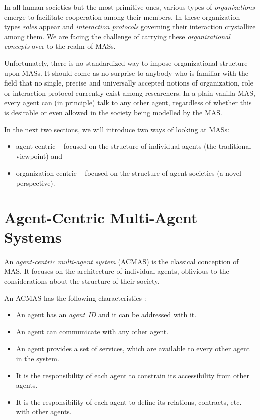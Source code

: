 In all human societies but the most primitive ones, various types of \textit{organizations} emerge to facilitate cooperation among their members.
In these organization types \textit{roles} appear and \textit{interaction protocols} governing their interaction crystallize among them.
We are facing the challenge of carrying these \textit{organizational concepts} over to the realm of MASs.

Unfortunately, there is no standardized way to impose organizational structure upon MASs.
It should come as no surprise to anybody who is familiar with the field that no single, precise and universally accepted notions of organization, role or interaction protocol currently exist among researchers.
In a plain vanilla MAS, every agent can (in principle) talk to any other agent, regardless of whether this is desirable or even allowed in the society being modelled by the MAS.

In the next two sections, we will introduce two ways of looking at MASs:
\begin{itemize}
	\item agent-centric -- focused on the structure of individual agents (the traditional viewpoint) and
	\item organization-centric -- focused on the structure of agent societies (a novel perspective).
\end{itemize}

\section{Agent-Centric Multi-Agent Systems}

An \textit{agent-centric multi-agent system} (ACMAS) is the classical conception of MAS.
It focuses on the architecture of individual agents, oblivious to the considerations about the structure of their society.

An ACMAS has the following characteristics \cite{Ferber03}:
\begin{itemize}
	\item An agent has an \textit{agent ID} and it can be addressed with it.
	\item An agent can communicate with any other agent.
	\item An agent provides a set of services, which are available to every other agent in the system.
	\item It is the responsibility of each agent to constrain its accessibility from other agents.
	\item It is the responsibility of each agent to define its relations, contracts, etc. with other agents.
\end{itemize}

